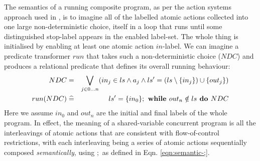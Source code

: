 The semantics of a running composite program,
as per the action systems approach used in \cite{DBLP:conf/icfem/WoodcockH02},
is to imagine all of the labelled atomic actions collected into one large
non-deterministic choice,
itself in a loop that runs until some distinguished stop-label appears
in the enabled label-set. The whole thing is initialised by enabling
at least one atomic action $in$-label.
We can imagine a predicate transformer $run$
that takes such a non-deterministic choice ($NDC$) and produces
a relational predicate that defines its overall running behaviour:
\begin{eqnarray}
   NDC
   &=&
   \bigvee_{j \in 0\dots n} (in_j \in ls
   \land
   a_j
   \land
   ls'=(ls\setminus\{{in_j}\})\cup\{{out_j}\})
\\ run(NDC)
   &\mathrel{\widehat=}&
   ls' = \{{in_0}\} ; \textbf{ while } out_n \notin ls \textbf{ do } NDC
\end{eqnarray}
Here we assume $in_0$ and $out_n$ are the initial and final labels of the whole
program.
In effect, the meaning of a shared-variable concurrent program
is all the interleavings of atomic actions that are consistent
with flow-of-control restrictions, with each interleaving
being a series of atomic actions sequentially composed \emph{semantically},
using $;$ as defined in Eqn. \ref{eqn:semantic-;}.

